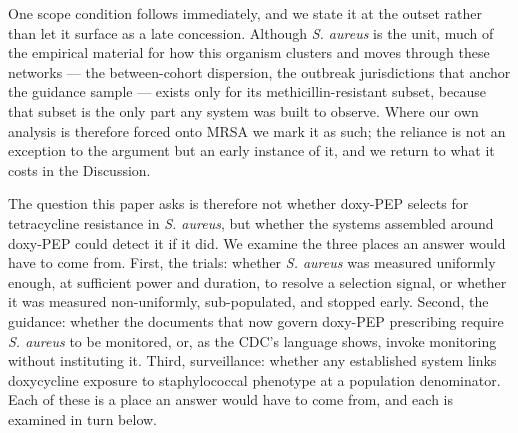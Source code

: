 \documentclass[10pt,letterpaper]{article}
\begin{document}
One scope condition follows immediately, and we state it at the outset
rather than let it surface as a late concession. Although \emph{S.
aureus} is the unit, much of the empirical material for how this
organism clusters and moves through these networks --- the
between-cohort dispersion, the outbreak jurisdictions that anchor the
guidance sample --- exists only for its methicillin-resistant subset,
because that subset is the only part any system was built to observe.
Where our own analysis is therefore forced onto MRSA we mark it as such;
the reliance is not an exception to the argument but an early instance
of it, and we return to what it costs in the Discussion.

The question this paper asks is therefore not whether doxy-PEP selects
for tetracycline resistance in \emph{S. aureus}, but whether the systems
assembled around doxy-PEP could detect it if it did. We examine the
three places an answer would have to come from. First, the trials:
whether \emph{S. aureus} was measured uniformly enough, at sufficient
power and duration, to resolve a selection signal, or whether it was
measured non-uniformly, sub-populated, and stopped early. Second, the
guidance: whether the documents that now govern doxy-PEP prescribing
require \emph{S. aureus} to be monitored, or, as the CDC's language
shows, invoke monitoring without instituting it. Third, surveillance:
whether any established system links doxycycline exposure to
staphylococcal phenotype at a population denominator. Each of these is a
place an answer would have to come from, and each is examined in turn
below.
\end{document}
